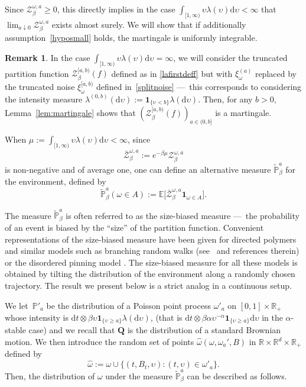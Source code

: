 \documentclass[10pt]{amsart}
\let\mathcal\mathscr
\let\sep:
\theoremstyle{definition}
\newtheorem{rem}[theorem]{Remark}
\newcommand{\dd}{\mathrm{d}}
\newcommand{\ind}{\mathbf{1}}
\newcommand{\cZ}{{\ensuremath{\mathcal Z}} }
\newcommand{\bQ}{{\ensuremath{\mathbf Q}} }
\newcommand{\bbE}{{\ensuremath{\mathbb E}} }
\newcommand{\bbP}{{\ensuremath{\mathbb P}} }
\newcommand{\bbR}{{\ensuremath{\mathbb R}} }
\let\gb\beta
\let\gl\lambda
\let\ups\upsilon
\let\go\omega
\begin{document}
Since $\cZ_{\gb}^{\go,a}\geq 0$, this directly implies
in the case $\int_{[1,\infty)} \ups \gl(\ups)\dd \ups<\infty$ that $\lim_{a\downarrow 0}\cZ^{\go,a}_{\beta}$ exists almost surely.
We will show that if additionally assumption~\eqref{hyposmall} holds,
the martingale is uniformly integrable.

\begin{rem}
In the case $\int_{[1,\infty)} \ups \gl(\ups)\dd \ups=\infty$,
we will consider the
truncated partition function
$\cZ_{\gb}^{[a,b)}(f)$ defined as in \eqref{lafirstdeff} but with $\xi_{\go}^{(a)}$ replaced by the truncated noise $\xi_{\go}^{[a,b)}$ defined in~\eqref{splitnoise} ---~this corresponds to considering
the intensity measure $\lambda^{(0,b)} (\dd \ups) := \ind_{\{\ups < b\}} \lambda(\dd \ups)$.
Then, for any $b>0$, Lemma~\ref{lem:martingale} shows that $(\cZ_{\gb}^{[a,b)}(f))_{a\in (0,b]}$ is a martingale.
\end{rem}

When $\mu:=\int_{[1,\infty)} \ups \gl(\ups)\dd \ups<\infty$, since
\[
\bar \cZ^{\go,a}_{\beta}:= e^{-\beta \mu} \cZ_{\gb}^{\go,a}
\]
is non-negative and of average one, one can define
an alternative measure $\tilde \bbP^a_{\beta}$ for the environment, defined by
\begin{equation}
\label{tildemeasure}
\tilde \bbP^a_{\beta}(\go\in A):= \bbE\bigl[ \bar \cZ_{\gb}^{\go,a} \ind_{\go\in A}\bigr].
\end{equation}

The measure $\tilde \bbP^a_{\beta}$ is often referred to as the size-biased measure
---~the probability of an event is biased by the ``size'' of the partition function.
Convenient representations of the size-biased measure have been given for directed polymers \cite[Lem.\,1]{Bir04} and similar models such as branching random walks (see~\cite[Ch.\,4]{ShiBRW} and references therein) or the disordered pinning model \cite[\S5.2]{LS17}.
The size-biased measure for all these models is obtained by tilting the distribution
of the environment along a randomly chosen trajectory.
The result we present below is a strict analog in a continuous setup.

We let~$\bbP'_a$ be the distribution of a Poisson point process $\go'_a$ on $[0,1]\times\bbR_+$ whose intensity is $\dd t \otimes \beta \ups \ind_{\{\ups \geq a\}}\gl(\dd \ups)$, (that is $\dd t \otimes \beta\alpha \ups^{-\alpha}\ind_{\{\ups \geq a\}} \dd \ups$ in the $\alpha$-stable case)
and we recall that $\bQ$ is the distribution
of a standard Brownian motion.
We then introduce the random set of points $\hat \go(\go, \go_a',B)$ in $\bbR\times \bbR^{d}\times \bbR_+$ defined by
\begin{equation}
\label{def:hatomega}
\hat \go:= \go \cup \bigl\{ (t,B_t,\ups) \sep (t,\ups)\in \go'_a \bigr\}.
\end{equation}
Then, the distribution of $\omega$ under the measure $\tilde \bbP^a_{\beta}$ can be described as follows.
\end{document}
